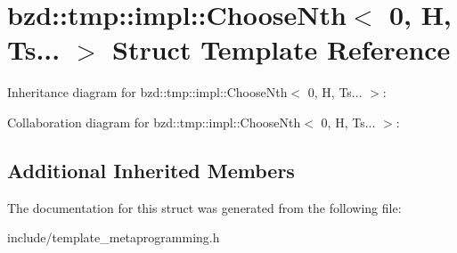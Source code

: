\hypertarget{structbzd_1_1tmp_1_1impl_1_1ChooseNth_3_010_00_01H_00_01Ts_8_8_8_01_4}{}\section{bzd\+:\+:tmp\+:\+:impl\+:\+:Choose\+Nth$<$ 0, H, Ts... $>$ Struct Template Reference}
\label{structbzd_1_1tmp_1_1impl_1_1ChooseNth_3_010_00_01H_00_01Ts_8_8_8_01_4}


Inheritance diagram for bzd\+:\+:tmp\+:\+:impl\+:\+:Choose\+Nth$<$ 0, H, Ts... $>$\+:


Collaboration diagram for bzd\+:\+:tmp\+:\+:impl\+:\+:Choose\+Nth$<$ 0, H, Ts... $>$\+:
\subsection*{Additional Inherited Members}


The documentation for this struct was generated from the following file\+:\begin{DoxyCompactItemize}
\item 
include/template\+\_\+metaprogramming.\+h\end{DoxyCompactItemize}
